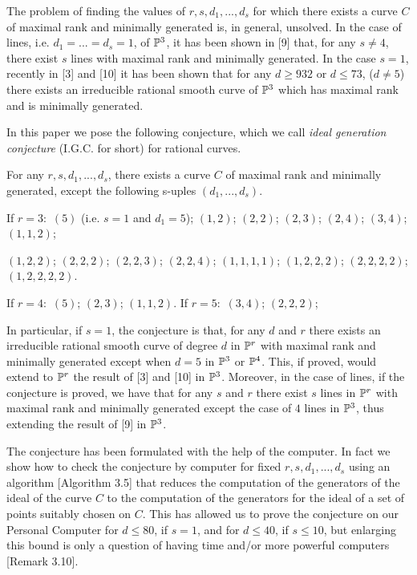  The problem
of finding the values of $r,s,d_1,...,d_s$ for which there exists a curve
 $C$  of maximal rank and 
minimally generated is, in general, unsolved. In the case of lines, i.e.
$d_1=...=d_s=1$, of $\Bbb P^3$, it has been shown in [9] that, for any
$s\neq 4$,
there exist $s$ lines with maximal rank and minimally generated. In the
case $s=1$,
 recently in [3] and [10]
 it has been shown that for any
$d\geq 932$ or $d\leq 73$, ($d\neq 5$) 
there exists an irreducible rational smooth curve of $\Bbb P^3$ which has
maximal
rank and  is
minimally generated.




In this paper we pose the following conjecture, which we call  {\sl
 ideal generation conjecture}
(I.G.C. for short) for rational curves.

For any 
$r,s,d_1,...,d_s$, 
there exists a curve $C$ of maximal rank and minimally generated,
 except the following s-uples $(d_1,...,d_s)$.\medskip

If $r=3:$ 
$(5)$ (i.e. $s=1$ and $d_1=5$); $(1,2)$; $(2,2)$; $(2,3)$; $(2,4)$;
 $(3,4)$; $(1,1,2)$; 

$(1,2,2)$; 
$(2,2,2)$; $(2,2,3)$; $(2,2,4)$; $(1,1,1,1)$;
$(1,2,2,2)$; $(2,2,2,2)$; $(1,2,2,2,2)$.\medskip

If $r=4:$ 
$(5)$; $(2,3)$; $(1,1,2)$.
\medskip
If $r=5:$
$(3,4)$; $(2,2,2)$;\medskip
 
In particular, if $s=1$, the conjecture is that, for any $d$ and $r$
there exists an irreducible rational smooth curve of degree $d$ in $\Bbb
P^r$ 
with maximal rank
and minimally generated except when $d=5$ in $\Bbb P^3$ or $\Bbb P^4$.
This, 
if proved,
 would
 extend
to $\Bbb P^r$ the result of [3] and [10] in $\Bbb P^3$. 
Moreover, in the case of lines, if the 
conjecture is proved, we have that for any $s$ and $r$ there exist $s$
 lines in $\Bbb P^r$ with maximal rank and minimally generated except the
case of 
$4$ lines
in $\Bbb P^3$, thus extending 
the result of [9] in $\Bbb P^3$.

The conjecture has been formulated 
with the help of the computer.
In fact we show how to check the conjecture by computer for fixed
$r,s,d_1,...,d_s$
 using an algorithm [Algorithm 3.5] that reduces
the computation of the generators of the ideal of the curve $C$
to the computation of the generators
for the ideal of a set of points suitably chosen on $C$. This has allowed
us to prove the conjecture 
on our Personal Computer for $d\leq 80$, if $s=1$, and for $d\leq 40$, if
$s\leq 10$,
 but enlarging this bound is only a question of having
time and/or more powerful computers [Remark 3.10].


